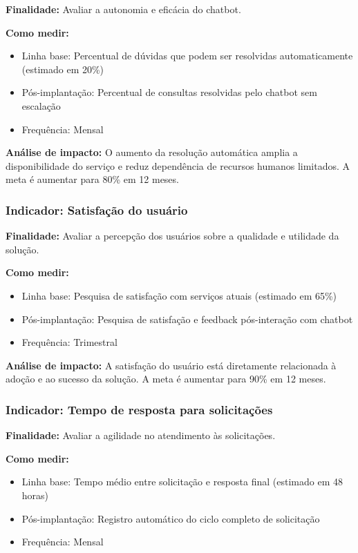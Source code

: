 \documentclass[12pt,a4paper]{article}
\begin{document}
\textbf{Finalidade:} Avaliar a autonomia e eficácia do chatbot.

\textbf{Como medir:} 
\begin{itemize}
    \item Linha base: Percentual de dúvidas que podem ser resolvidas automaticamente (estimado em 20\%)
    \item Pós-implantação: Percentual de consultas resolvidas pelo chatbot sem escalação
    \item Frequência: Mensal
\end{itemize}

\textbf{Análise de impacto:} O aumento da resolução automática amplia a disponibilidade do serviço e reduz dependência de recursos humanos limitados. A meta é aumentar para 80\% em 12 meses.

\subsubsection{Indicador: Satisfação do usuário}

\textbf{Finalidade:} Avaliar a percepção dos usuários sobre a qualidade e utilidade da solução.

\textbf{Como medir:} 
\begin{itemize}
    \item Linha base: Pesquisa de satisfação com serviços atuais (estimado em 65\%)
    \item Pós-implantação: Pesquisa de satisfação e feedback pós-interação com chatbot
    \item Frequência: Trimestral
\end{itemize}

\textbf{Análise de impacto:} A satisfação do usuário está diretamente relacionada à adoção e ao sucesso da solução. A meta é aumentar para 90\% em 12 meses.

\subsubsection{Indicador: Tempo de resposta para solicitações}

\textbf{Finalidade:} Avaliar a agilidade no atendimento às solicitações.

\textbf{Como medir:} 
\begin{itemize}
    \item Linha base: Tempo médio entre solicitação e resposta final (estimado em 48 horas)
    \item Pós-implantação: Registro automático do ciclo completo de solicitação
    \item Frequência: Mensal
\end{itemize}
\end{document}
